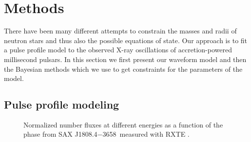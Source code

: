\documentclass{wihuri}
\def\source{SAX J1808.4$-$3658}
\begin{document}
\fi

\clearpage

\section{Methods}


There have been many different attempts to constrain the masses and radii of neutron stars and thus also the possible equations of state. Our approach is to fit a pulse profile model to the observed X-ray oscillations of accretion-powered millisecond pulsars. In this section we first present our waveform model and then the Bayesian methods which we use to get constraints for the parameters of the model. %

\subsection{Pulse profile modeling}


\begin{figure}
\centerline{} 
\caption{Normalized number fluxes at different energies as a function of the phase from \source \ measured with RXTE . 
\label{fig:saxdata}}
\end{figure}
\end{document}
